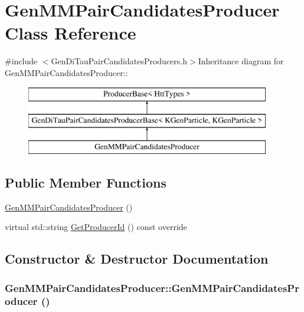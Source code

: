 \hypertarget{classGenMMPairCandidatesProducer}{
\section{GenMMPairCandidatesProducer Class Reference}
\label{classGenMMPairCandidatesProducer}
}


{\ttfamily \#include $<$GenDiTauPairCandidatesProducers.h$>$}Inheritance diagram for GenMMPairCandidatesProducer::\begin{figure}[H]
\begin{center}
\leavevmode
\includegraphics[height=3cm]{classGenMMPairCandidatesProducer}
\end{center}
\end{figure}
\subsection*{Public Member Functions}
\begin{DoxyCompactItemize}
\item 
\hyperlink{classGenMMPairCandidatesProducer_a0c154e49349caf99a6f2009f00eabadb}{GenMMPairCandidatesProducer} ()
\item 
virtual std::string \hyperlink{classGenMMPairCandidatesProducer_afba80a1c2a111baea0ab42d83dbe787e}{GetProducerId} () const override
\end{DoxyCompactItemize}


\subsection{Constructor \& Destructor Documentation}
\hypertarget{classGenMMPairCandidatesProducer_a0c154e49349caf99a6f2009f00eabadb}{
\subsubsection[{GenMMPairCandidatesProducer}]{\setlength{\rightskip}{0pt plus 5cm}GenMMPairCandidatesProducer::GenMMPairCandidatesProducer ()}}
\label{classGenMMPairCandidatesProducer_a0c154e49349caf99a6f2009f00eabadb}


